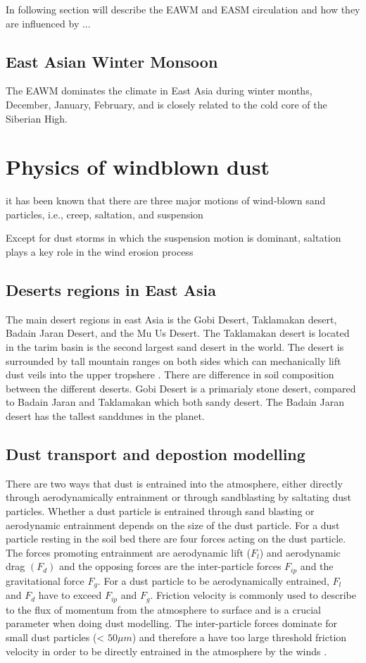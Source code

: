 In following section will describe the EAWM and EASM circulation and how they are influenced by ...   

\subsection{East Asian Winter Monsoon}
The EAWM dominates the climate in East Asia during winter months, December, January, February, and is closely related to the cold core of the Siberian High.  

\section{Physics of windblown dust}
it has been known that there are three major motions of wind‐blown sand particles, i.e., creep, saltation, and suspension

Except for dust storms in which the suspension motion is dominant, saltation plays a key role in the wind erosion process
\subsection{Deserts regions in East Asia}
The main desert regions in east Asia is the Gobi Desert, Taklamakan desert, Badain Jaran Desert,  and the Mu Us Desert. The Taklamakan desert is located in the tarim basin is the second largest sand desert in the world. The desert is surrounded by tall mountain ranges on both sides which can mechanically lift dust veils into the upper tropshere \parencite{yumimoto_elevated_2009}.   There are difference in soil composition between the different deserts. Gobi Desert is a primarialy stone desert, compared to Badain Jaran and Taklamakan which both sandy desert. The Badain Jaran desert has the tallest sanddunes in the planet. 

\subsection{Dust transport and depostion modelling}
There are two ways that dust is entrained into the atmosphere, either directly through aerodynamically entrainment or through sandblasting by saltating dust particles. Whether a dust particle is entrained through sand blasting or aerodynamic entrainment depends on the size of the dust particle. For a dust particle resting in the soil bed there are four forces acting on the dust particle. The forces promoting entrainment are aerodynamic lift ($F_l$) and aerodynamic drag $(F_d)$ and the opposing forces are the inter-particle forces $F_{ip}$ and the gravitational force $F_g$. For a dust particle to be aerodynamically entrained, $F_l$ and $F_d$ have to exceed $F_{ip}$ and $F_g$. Friction velocity is commonly used to describe to the flux of momentum from the atmosphere to surface and is a crucial parameter when doing dust modelling. The inter-particle forces dominate for small dust particles  (< $50\mu m $) and therefore a have too large threshold friction velocity in order to be directly entrained in the atmosphere by the winds \parencite{kok2012physics}. 

